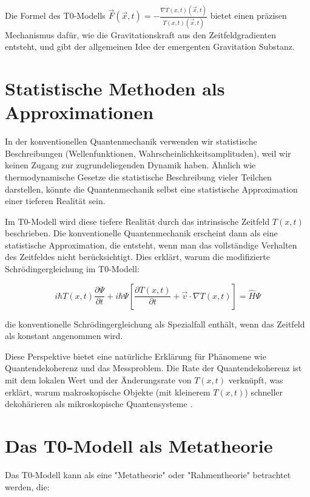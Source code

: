 \documentclass[12pt,a4paper]{article}
\newcommand{\Tfieldt}{T(x,t)}
\newcommand{\vecx}{\vec{x}}
\begin{document}
	Die Formel des T0-Modells $\vec{F}(\vecx,t) = -\frac{\nabla\Tfieldt(\vecx,t)}{\Tfieldt(\vecx,t)}$ bietet einen präzisen Mechanismus dafür, wie die Gravitationskraft aus den Zeitfeldgradienten entsteht, und gibt der allgemeinen Idee der emergenten Gravitation Substanz.
	
	\section{Statistische Methoden als Approximationen}
	\label{sec:statistical}
	
	In der konventionellen Quantenmechanik verwenden wir statistische Beschreibungen (Wellenfunktionen, Wahrscheinlichkeitsamplituden), weil wir keinen Zugang zur zugrundeliegenden Dynamik haben. Ähnlich wie thermodynamische Gesetze die statistische Beschreibung vieler Teilchen darstellen, könnte die Quantenmechanik selbst eine statistische Approximation einer tieferen Realität sein.
	
	Im T0-Modell wird diese tiefere Realität durch das intrinsische Zeitfeld $\Tfieldt$ beschrieben. Die konventionelle Quantenmechanik erscheint dann als eine statistische Approximation, die entsteht, wenn man das vollständige Verhalten des Zeitfeldes nicht berücksichtigt. Dies erklärt, warum die modifizierte Schrödingergleichung im T0-Modell:
	
	\begin{equation}
		i\hbar \Tfieldt \frac{\partial\Psi}{\partial t} + i\hbar \Psi \left[\frac{\partial \Tfieldt}{\partial t} + \vec{v}\cdot\nabla\Tfieldt\right] = \hat{H} \Psi
		\label{eq:dynamic_schrodinger}
	\end{equation}
	
	die konventionelle Schrödingergleichung als Spezialfall enthält, wenn das Zeitfeld als konstant angenommen wird.
	
	Diese Perspektive bietet eine natürliche Erklärung für Phänomene wie Quantendekoherenz und das Messproblem. Die Rate der Quantendekoherenz ist mit dem lokalen Wert und der Änderungsrate von $\Tfieldt$ verknüpft, was erklärt, warum makroskopische Objekte (mit kleinerem $\Tfieldt$) schneller dekohärieren als mikroskopische Quantensysteme \cite{pascher_quantum_2025}.
	
	\section{Das T0-Modell als Metatheorie}
	\label{sec:metatheory}
	
	Das T0-Modell kann als eine "Metatheorie" oder "Rahmentheorie" betrachtet werden, die:
	
\end{document}
